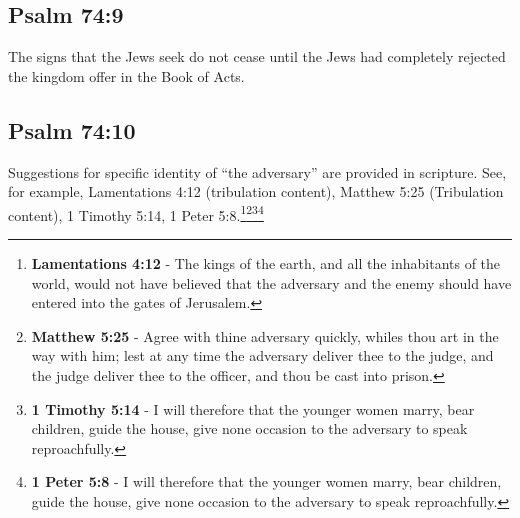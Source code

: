 \subsection{Psalm 74:9}
The signs that the Jews seek do not cease until the Jews had completely rejected the kingdom offer in the Book of Acts. 

\subsection{Psalm 74:10}
Suggestions for specific identity of ``the adversary'' are provided in scripture. See, for example, Lamentations 4:12 (tribulation content), Matthew 5:25 (Tribulation content), 1 Timothy 5:14, 1 Peter 5:8.\footnote{\textbf{Lamentations 4:12} - The kings of the earth, and all the inhabitants of the world, would not have believed that the adversary and the enemy should have entered into the gates of Jerusalem.}\footnote{\textbf{Matthew 5:25} - Agree with thine adversary quickly, whiles thou art in the way with him; lest at any time the adversary deliver thee to the judge, and the judge deliver thee to the officer, and thou be cast into prison.}\footnote{\textbf{1 Timothy 5:14} - I will therefore that the younger women marry, bear children, guide the house, give none occasion to the adversary to speak reproachfully.}\footnote{\textbf{1 Peter 5:8} - I will therefore that the younger women marry, bear children, guide the house, give none occasion to the adversary to speak reproachfully.}
